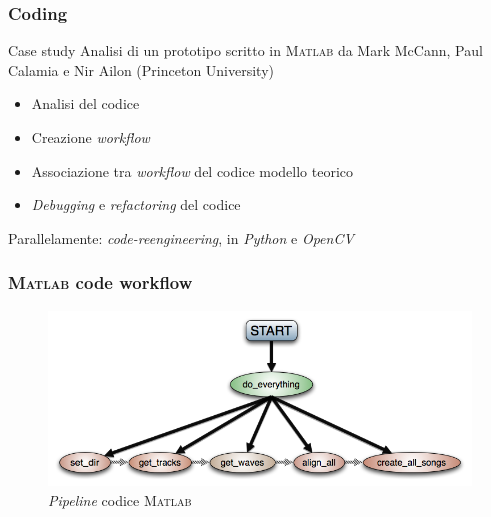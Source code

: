 \begin{frame}
\frametitle{Coding}
\begin{block}{Case study}
Analisi di un prototipo scritto in \textsc{Matlab} da Mark McCann, Paul Calamia
e Nir Ailon (Princeton University)
\end{block}

\begin{block}{}
\begin{itemize}
\item Analisi del codice
\item Creazione \emph{workflow}
\item Associazione tra \emph{workflow} del codice modello teorico
\item \textit{Debugging} e \textit{refactoring} del codice
\end{itemize}
\end{block}

\begin{block}{}
Parallelamente: \emph{code-reengineering}, in \emph{Python}
e \emph{OpenCV}
\end{block}
\end{frame}

\begin{frame}
\frametitle{\textsc{Matlab} code workflow}
\begin{figure}
\includegraphics[width=\textwidth]{immagini/workflow.png}
\caption{\emph{Pipeline} codice \textsc{Matlab}}
\end{figure}
\end{frame}

